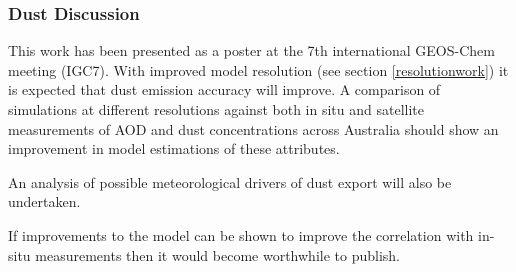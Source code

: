 \subsubsection{Dust Discussion}

This work has been presented as a poster at the 7th international GEOS-Chem meeting (IGC7).
With improved model resolution (see section \ref{resolutionwork}) it is expected that dust emission accuracy will improve.
A comparison of simulations at different resolutions against both in situ and satellite measurements of AOD and dust concentrations across Australia should show an improvement in model estimations of these attributes.

An analysis of possible meteorological drivers of dust export will also be undertaken.

If improvements to the model can be shown to improve the correlation with in-situ measurements then it would become worthwhile to publish.
